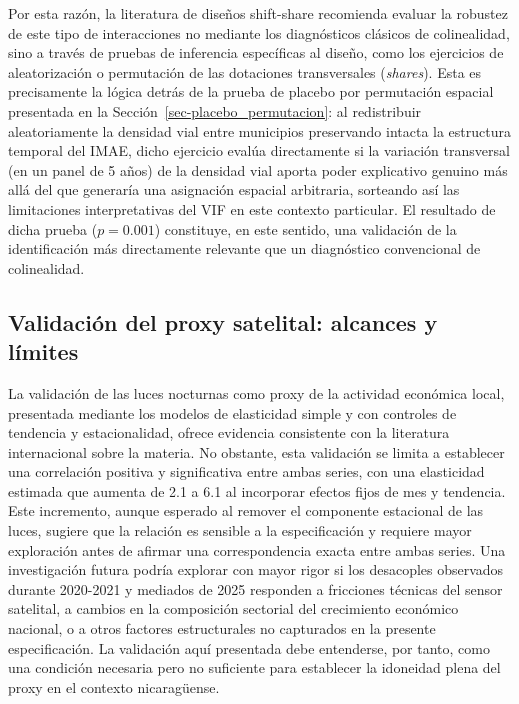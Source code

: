 \documentclass[
  spanish,
  12pt,
  letterpaper]{article}
\begin{document}
Por esta razón, la literatura de diseños shift-share recomienda evaluar
la robustez de este tipo de interacciones no mediante los diagnósticos
clásicos de colinealidad, sino a través de pruebas de inferencia
específicas al diseño, como los ejercicios de aleatorización o
permutación de las dotaciones transversales (\emph{shares}). Esta es
precisamente la lógica detrás de la prueba de placebo por permutación
espacial presentada en la Sección~\ref{sec-placebo_permutacion}: al
redistribuir aleatoriamente la densidad vial entre municipios
preservando intacta la estructura temporal del IMAE, dicho ejercicio
evalúa directamente si la variación transversal (en un panel de 5 años)
de la densidad vial aporta poder explicativo genuino más allá del que
generaría una asignación espacial arbitraria, sorteando así las
limitaciones interpretativas del VIF en este contexto particular. El
resultado de dicha prueba (\(p = 0.001\)) constituye, en este sentido,
una validación de la identificación más directamente relevante que un
diagnóstico convencional de colinealidad.

\subsection{Validación del proxy satelital: alcances y
límites}\label{validaciuxf3n-del-proxy-satelital-alcances-y-luxedmites}

La validación de las luces nocturnas como proxy de la actividad
económica local, presentada mediante los modelos de elasticidad simple y
con controles de tendencia y estacionalidad, ofrece evidencia
consistente con la literatura internacional sobre la materia. No
obstante, esta validación se limita a establecer una correlación
positiva y significativa entre ambas series, con una elasticidad
estimada que aumenta de 2.1 a 6.1 al incorporar efectos fijos de mes y
tendencia. Este incremento, aunque esperado al remover el componente
estacional de las luces, sugiere que la relación es sensible a la
especificación y requiere mayor exploración antes de afirmar una
correspondencia exacta entre ambas series. Una investigación futura
podría explorar con mayor rigor si los desacoples observados durante
2020-2021 y mediados de 2025 responden a fricciones técnicas del sensor
satelital, a cambios en la composición sectorial del crecimiento
económico nacional, o a otros factores estructurales no capturados en la
presente especificación. La validación aquí presentada debe entenderse,
por tanto, como una condición necesaria pero no suficiente para
establecer la idoneidad plena del proxy en el contexto nicaragüense.
\end{document}
